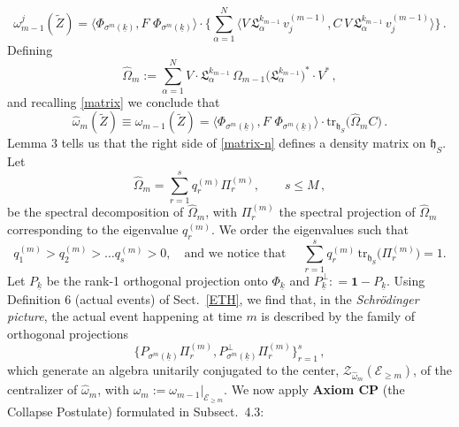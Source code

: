 \documentclass[a4paper,11pt]{article}
\begin{document}
$$\omega_{m-1}^{j}(\tilde{Z})= \langle \Phi_{\sigma^{m}(\underline{k})}, F\,\, 
\Phi_{\sigma^{m}(\underline{k})} \rangle \cdot \Big\{ \sum_{\alpha=1}^{N} \langle V\,\mathfrak{L}_{\alpha}^{{k}_{m-1}}\,
v_{j}^{(m-1)}, C\,V\,\mathfrak{L}_{\alpha}^{{k}_{m-1}}\, v_{j}^{(m-1)}\rangle\Big\}\,.$$
Defining
\begin{equation}\label{matrix-n}
\widehat{\Omega}_{m}:= \sum_{\alpha=1}^{N} V\cdot \mathfrak{L}_{\alpha}^{k_{m-1}} \, \Omega_{m-1}
\big(\mathfrak{L}_{\alpha}^{k_{m-1}}\big)^{*}\cdot V^{*}\,,
\end{equation}
and recalling \eqref{matrix} we conclude that
\begin{equation}\label{time evol}
\widehat{\omega}_{m}(\tilde{Z})\equiv \omega_{m-1}(\tilde{Z})= \langle \Phi_{\sigma^{m}(\underline{k})}, F\,\, \Phi_{\sigma^{m}(\underline{k})} \rangle \cdot 
\text{tr}_{\mathfrak{h}_S} \big(\widehat{\Omega}_{m} C\big)\,.
\end{equation}
Lemma 3 tells us that the right side of \eqref{matrix-n} defines a density matrix on $\mathfrak{h}_S$. Let
\begin{equation}\label{spect dec}
\widehat{\Omega}_{m} = \sum_{r=1}^{s} q_{r}^{(m)} \Pi_{r}^{(m)}, \qquad s\leq M\,,
\end{equation}
be the spectral decomposition of $\widehat{\Omega}_m$, with $\Pi_{r}^{(m)}$ the spectral projection of 
$\widehat{\Omega}_m$ corresponding to the eigenvalue $q_{r}^{(m)}$. We order the eigenvalues such that
$$q_{1}^{(m)} > q_{2}^{(m)} > \dots q_{s}^{(m)} > 0,\quad  \text{and we notice that }\quad
\sum_{r=1}^{s} q_{r}^{(m)} \,\text{tr}_{\mathfrak{h}_S}\big(\Pi_{r}^{(m)}\big) =1.$$
Let $P_{\underline{k}}$ be the rank-1 orthogonal projection onto $\Phi_{\underline{k}}$ and 
$P_{\underline{k}}^{\perp}: =\mathbf{1}- P_{\underline{k}}$. Using Definition 6 (actual events) of Sect.~\ref{ETH}, 
we find that, in the \textit{Schr\"odinger picture}, the actual event happening at time $m$ is described  
by the family of orthogonal projections 
\begin{equation}\label{event m}
\big\{P_{\sigma^{m}(\underline{k})} \Pi_{r}^{(m)}, P_{\sigma^{m}(\underline{k})}^{\perp} \Pi_{r}^{(m)}\big\}_{r=1}^{s}\,,
\end{equation}
which generate an algebra unitarily conjugated to the center, $\mathcal{Z}_{\widehat{\omega}_m}(\mathcal{E}_{\geq m})$, 
of the centralizer of $\widehat{\omega}_m$, with $\widehat{\omega}_m :=\omega_{m-1}\vert_{\mathcal{E}_{\geq m}}$. We now apply {\bf{Axiom CP}} (the Collapse Postulate) formulated in Subsect.~4.3: 
\end{document}

